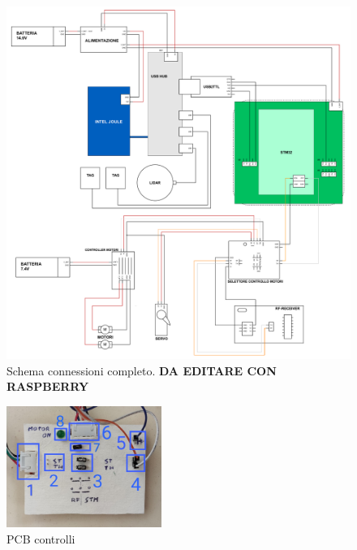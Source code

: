 \begin{figure}[] 
	\centering    
	\includegraphics[width=1\textwidth]{schema_completo.pdf}
	\caption{Schema connessioni completo. \textbf{DA EDITARE CON RASPBERRY}}
	\label{fig:schema_completo}
\end{figure}

\begin{figure}[] 
	\centering
	\includegraphics[width=0.45\textwidth]{pcb_controlli.png}
	\caption{PCB controlli}
	\label{fig:pcb_controlli}
\end{figure}



